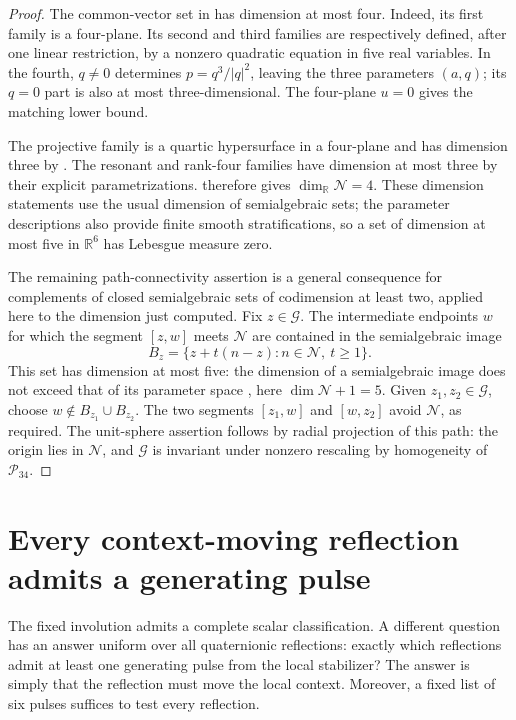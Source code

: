 \documentclass[11pt,a4paper]{article}
\newcommand{\RR}{\mathbb R}
\begin{document}
\begin{proof}
The common-vector set in  has dimension at most four.  Indeed, its first family is a four-plane.  Its second and third families are respectively defined, after one linear restriction, by a nonzero quadratic equation in five real variables.  In the fourth, $q\ne0$ determines $p=q^3/|q|^2$, leaving the three parameters $(a,q)$; its $q=0$ part is also at most three-dimensional.  The four-plane $u=0$ gives the matching lower bound.

The projective family is a quartic hypersurface in a four-plane and has dimension three by .  The resonant and rank-four families have dimension at most three by their explicit parametrizations.   therefore gives $\dim_\RR\mathcal N=4$.  These dimension statements use the usual dimension of semialgebraic sets; the parameter descriptions also provide finite smooth stratifications, so a set of dimension at most five in $\RR^6$ has Lebesgue measure zero.

The remaining path-connectivity assertion is a general consequence for complements of closed semialgebraic sets of codimension at least two, applied here to the dimension just computed.  Fix $z\in\mathcal G$.  The intermediate endpoints $w$ for which the segment $[z,w]$ meets $\mathcal N$ are contained in the semialgebraic image
\[
B_z=\{z+t(n-z):n\in\mathcal N,\ t\ge1\}.
\]
This set has dimension at most five: the dimension of a semialgebraic image does not exceed that of its parameter space \cite[\S2.8]{BochnakCosteRoy1998}, here $\dim\mathcal N+1=5$.  Given $z_1,z_2\in\mathcal G$, choose $w\notin B_{z_1}\cup B_{z_2}$.  The two segments $[z_1,w]$ and $[w,z_2]$ avoid $\mathcal N$, as required.  The unit-sphere assertion follows by radial projection of this path: the origin lies in $\mathcal N$, and $\mathcal G$ is invariant under nonzero rescaling by homogeneity of $\mathcal P_{34}$.
\end{proof}

\section{Every context-moving reflection admits a generating pulse}
\label{sec:varying-switch}

The fixed involution admits a complete scalar classification.  A different question has an answer uniform over all quaternionic reflections: exactly which reflections admit at least one generating pulse from the local stabilizer?  The answer is simply that the reflection must move the local context.  Moreover, a fixed list of six pulses suffices to test every reflection.
\end{document}
